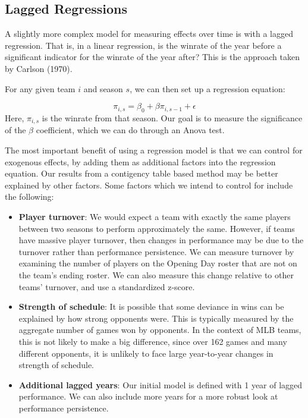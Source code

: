 \documentclass[11pt,]{article}
\providecommand{\tightlist}{%
  \setlength{\itemsep}{0pt}\setlength{\parskip}{0pt}}
\begin{document}
\subsection{Lagged Regressions}\label{lagged-regressions}

A slightly more complex model for measuring effects over time is with a
lagged regression. That is, in a linear regression, is the winrate of
the year before a significant indicator for the winrate of the year
after? This is the approach taken by Carlson (1970).

For any given team \(i\) and season \(s\), we can then set up a
regression equation:

\[\pi_{i,s} = \beta_0 + \beta \pi_{i, s-1} + \epsilon\] Here,
\(\pi_{i,s}\) is the winrate from that season. Our goal is to measure
the significance of the \(\beta\) coefficient, which we can do through
an Anova test.

The most important benefit of using a regression model is that we can
control for exogenous effects, by adding them as additional factors into
the regression equation. Our results from a contigency table based
method may be better explained by other factors. Some factors which we
intend to control for include the following:

\begin{itemize}
\tightlist
\item
  \textbf{Player turnover}: We would expect a team with exactly the same
  players between two seasons to perform approximately the same.
  However, if teams have massive player turnover, then changes in
  performance may be due to the turnover rather than performance
  persistence. We can measure turnover by examining the number of
  players on the Opening Day roster that are not on the team's ending
  roster. We can also measure this change relative to other teams'
  turnover, and use a standardized z-score.
\item
  \textbf{Strength of schedule}: It is possible that some deviance in
  wins can be explained by how strong opponents were. This is typically
  measured by the aggregate number of games won by opponents. In the
  context of MLB teams, this is not likely to make a big difference,
  since over 162 games and many different opponents, it is unlikely to
  face large year-to-year changes in strength of schedule.
\item
  \textbf{Additional lagged years}: Our initial model is defined with 1
  year of lagged performance. We can also include more years for a more
  robust look at performance persistence.
\end{itemize}
\end{document}
